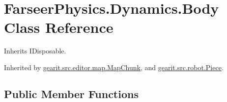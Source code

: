 \hypertarget{class_farseer_physics_1_1_dynamics_1_1_body}{\section{Farseer\+Physics.\+Dynamics.\+Body Class Reference}
\label{class_farseer_physics_1_1_dynamics_1_1_body}
}


Inherits I\+Disposable.



Inherited by \hyperlink{classgearit_1_1src_1_1editor_1_1map_1_1_map_chunk}{gearit.\+src.\+editor.\+map.\+Map\+Chunk}, and \hyperlink{classgearit_1_1src_1_1robot_1_1_piece}{gearit.\+src.\+robot.\+Piece}.

\subsection*{Public Member Functions}
